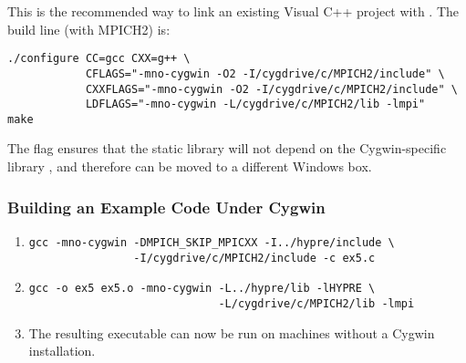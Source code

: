 This is the recommended way to link an existing Visual C++ project with
\hypre{}. The build line (with MPICH2) is:
\begin{verbatim}
./configure CC=gcc CXX=g++ \
            CFLAGS="-mno-cygwin -O2 -I/cygdrive/c/MPICH2/include" \
            CXXFLAGS="-mno-cygwin -O2 -I/cygdrive/c/MPICH2/include" \
            LDFLAGS="-mno-cygwin -L/cygdrive/c/MPICH2/lib -lmpi"
make
\end{verbatim}
The \kbd{-mno-cygwin} flag ensures that the static library will not depend on
the Cygwin-specific library , and therefore can be moved to a
different Windows box.

\subsubsection{Building an Example Code Under Cygwin}
\begin{enumerate}
\item
\begin{verbatim}
gcc -mno-cygwin -DMPICH_SKIP_MPICXX -I../hypre/include \
                -I/cygdrive/c/MPICH2/include -c ex5.c
\end{verbatim}
\item
\begin{verbatim}
gcc -o ex5 ex5.o -mno-cygwin -L../hypre/lib -lHYPRE \
                             -L/cygdrive/c/MPICH2/lib -lmpi
\end{verbatim}
\item
The resulting executable can now be run on machines without a Cygwin
installation.
\end{enumerate}

